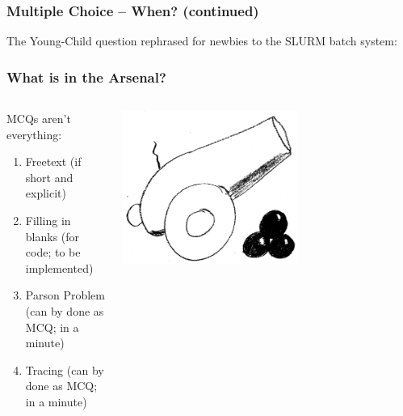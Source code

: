 \begin{frame}
 \frametitle{Multiple Choice -- When? (continued)}
 
 The Young-Child question rephrased for newbies to the SLURM batch system:
 \vspace{-1em}
\end{frame}

\begin{frame}
  \frametitle{What is in the Arsenal?}
  \begin{columns}
   \begin{column}{.5\textwidth}
    MCQs aren't everything:
     \begin{enumerate}
      \item Freetext (if short and explicit)
      \item Filling in blanks (for code; to be implemented)
      \item Parson Problem (can by done as MCQ; in a minute)
      \item Tracing (can by done as MCQ; in a minute)
     \end{enumerate}
   \end{column}
   \begin{column}{.5\textwidth}
       \centering
      \includegraphics[width=0.6\textwidth]{images/arsenal}
    \end{column}
  \end{columns}
\end{frame}

